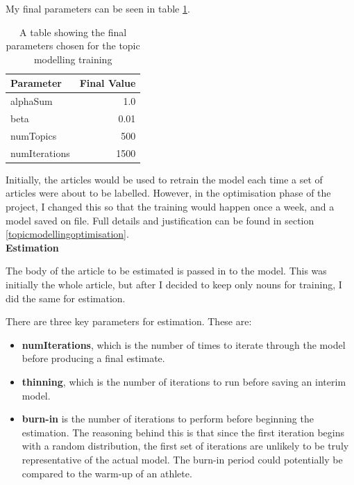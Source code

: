 \documentclass[12pt]{article}
\begin{document}
My final parameters can be seen in table \ref{topicmodellingtraining}.

\begin{table}[H]
	\centering
	\begin{tabular}{l|r}
		\textbf{Parameter} & \textbf{Final Value} \\ \hline
		alphaSum & 1.0 \\ \hline
		beta & 0.01 \\ \hline
		numTopics & 500 \\ \hline
		numIterations & 1500 \\ \hline
	\end{tabular}
	\caption[Parameters for training topic models]{A table showing the final parameters chosen for the topic modelling training}
	\label{topicmodellingtraining}
\end{table}

Initially, the articles would be used to retrain the model each time a set of articles were about to be labelled. However, in the optimisation phase of the project, I changed this so that the training would happen once a week, and a model saved on file. Full details and justification can be found in section \ref{topicmodellingoptimisation}. \\

\textbf{Estimation}

The body of the article to be estimated is passed in to the model. This was initially the whole article, but after I decided to keep only nouns for training, I did the same for estimation. 

There are three key parameters for estimation. These are:

\begin{itemize}
	\item \textbf{numIterations}, which is the number of times to iterate through the model before producing a final estimate. \\
	\item \textbf{thinning}, which is the number of iterations to run before saving an interim model.\\
	\item \textbf{burn-in} is the number of iterations to perform before beginning the estimation. The reasoning behind this is that since the first iteration begins with a random distribution, the first set of iterations are unlikely to be truly representative of the actual model. The burn-in period could potentially be compared to the warm-up of an athlete. \\
\end{itemize}
\end{document}
